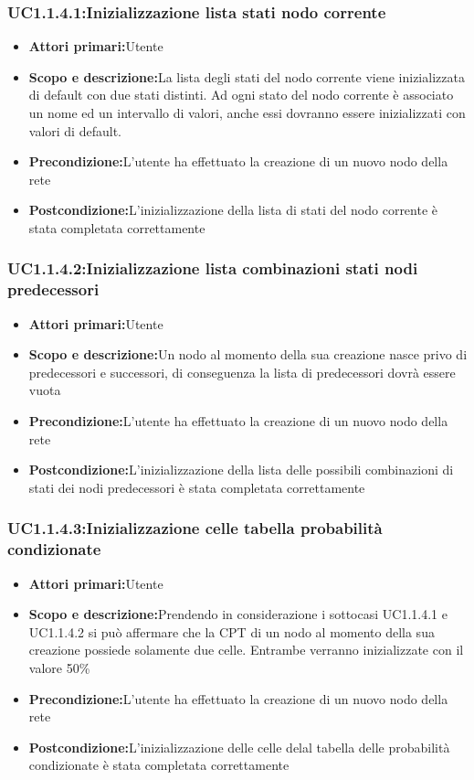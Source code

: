 \subsubsection{UC1.1.4.1:Inizializzazione lista stati nodo corrente}
\begin{itemize}
	\item{\textbf{Attori primari:}Utente}
	\item{\textbf{Scopo e descrizione:}La lista degli stati del nodo corrente viene inizializzata di default con due stati distinti. Ad ogni stato del nodo corrente è associato un nome ed un intervallo di valori, anche essi dovranno essere inizializzati con valori di default.}
	\item{\textbf{Precondizione:}L'utente ha effettuato la creazione di un nuovo nodo della rete}
	\item{\textbf{Postcondizione:}L'inizializzazione della lista di stati del nodo corrente è stata completata correttamente}
\end{itemize}
\subsubsection{UC1.1.4.2:Inizializzazione lista combinazioni stati nodi predecessori}
\begin{itemize}
	\item{\textbf{Attori primari:}Utente}
	\item{\textbf{Scopo e descrizione:}Un nodo al momento della sua creazione nasce privo di predecessori e successori, di conseguenza la lista di predecessori dovrà essere vuota}
	\item{\textbf{Precondizione:}L'utente ha effettuato la creazione di un nuovo nodo della rete}
	\item{\textbf{Postcondizione:}L'inizializzazione della lista delle possibili combinazioni di stati dei nodi predecessori è stata completata correttamente}
\end{itemize}
\subsubsection{UC1.1.4.3:Inizializzazione celle tabella probabilità condizionate}
\begin{itemize}
	\item{\textbf{Attori primari:}Utente}
	\item{\textbf{Scopo e descrizione:}Prendendo in considerazione i sottocasi UC1.1.4.1 e UC1.1.4.2 si può affermare che la CPT di un nodo al momento della sua creazione possiede solamente due celle. Entrambe verranno inizializzate con il valore 50\%}
	\item{\textbf{Precondizione:}L'utente ha effettuato la creazione di un nuovo nodo della rete}
	\item{\textbf{Postcondizione:}L'inizializzazione delle celle delal tabella delle probabilità condizionate è stata completata correttamente}
\end{itemize}

